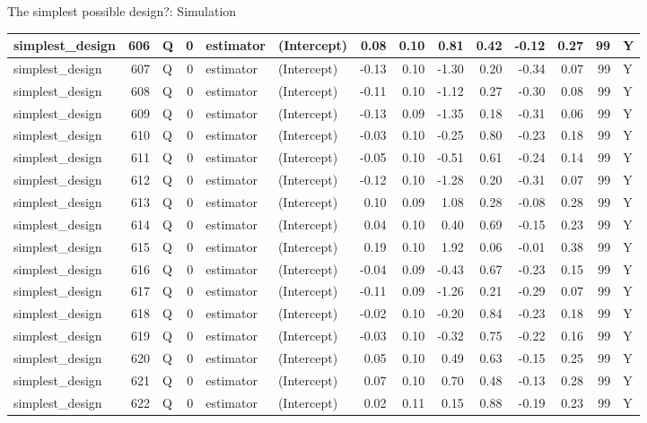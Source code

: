 \documentclass[
  11pt,
  ignorenonframetext,
]{beamer}
\begin{document}
\begin{frame}[fragile]{The simplest possible design?: Simulation}
\begin{tabular}{l|r|l|r|l|l|r|r|r|r|r|r|r|l}
\hline
simplest\_design & 606 & Q & 0 & estimator & (Intercept) & 0.08 & 0.10 & 0.81 & 0.42 & -0.12 & 0.27 & 99 & Y\\
\hline
simplest\_design & 607 & Q & 0 & estimator & (Intercept) & -0.13 & 0.10 & -1.30 & 0.20 & -0.34 & 0.07 & 99 & Y\\
\hline
simplest\_design & 608 & Q & 0 & estimator & (Intercept) & -0.11 & 0.10 & -1.12 & 0.27 & -0.30 & 0.08 & 99 & Y\\
\hline
simplest\_design & 609 & Q & 0 & estimator & (Intercept) & -0.13 & 0.09 & -1.35 & 0.18 & -0.31 & 0.06 & 99 & Y\\
\hline
simplest\_design & 610 & Q & 0 & estimator & (Intercept) & -0.03 & 0.10 & -0.25 & 0.80 & -0.23 & 0.18 & 99 & Y\\
\hline
simplest\_design & 611 & Q & 0 & estimator & (Intercept) & -0.05 & 0.10 & -0.51 & 0.61 & -0.24 & 0.14 & 99 & Y\\
\hline
simplest\_design & 612 & Q & 0 & estimator & (Intercept) & -0.12 & 0.10 & -1.28 & 0.20 & -0.31 & 0.07 & 99 & Y\\
\hline
simplest\_design & 613 & Q & 0 & estimator & (Intercept) & 0.10 & 0.09 & 1.08 & 0.28 & -0.08 & 0.28 & 99 & Y\\
\hline
simplest\_design & 614 & Q & 0 & estimator & (Intercept) & 0.04 & 0.10 & 0.40 & 0.69 & -0.15 & 0.23 & 99 & Y\\
\hline
simplest\_design & 615 & Q & 0 & estimator & (Intercept) & 0.19 & 0.10 & 1.92 & 0.06 & -0.01 & 0.38 & 99 & Y\\
\hline
simplest\_design & 616 & Q & 0 & estimator & (Intercept) & -0.04 & 0.09 & -0.43 & 0.67 & -0.23 & 0.15 & 99 & Y\\
\hline
simplest\_design & 617 & Q & 0 & estimator & (Intercept) & -0.11 & 0.09 & -1.26 & 0.21 & -0.29 & 0.07 & 99 & Y\\
\hline
simplest\_design & 618 & Q & 0 & estimator & (Intercept) & -0.02 & 0.10 & -0.20 & 0.84 & -0.23 & 0.18 & 99 & Y\\
\hline
simplest\_design & 619 & Q & 0 & estimator & (Intercept) & -0.03 & 0.10 & -0.32 & 0.75 & -0.22 & 0.16 & 99 & Y\\
\hline
simplest\_design & 620 & Q & 0 & estimator & (Intercept) & 0.05 & 0.10 & 0.49 & 0.63 & -0.15 & 0.25 & 99 & Y\\
\hline
simplest\_design & 621 & Q & 0 & estimator & (Intercept) & 0.07 & 0.10 & 0.70 & 0.48 & -0.13 & 0.28 & 99 & Y\\
\hline
simplest\_design & 622 & Q & 0 & estimator & (Intercept) & 0.02 & 0.11 & 0.15 & 0.88 & -0.19 & 0.23 & 99 & Y\\

\end{tabular}
\end{frame}
\end{document}
